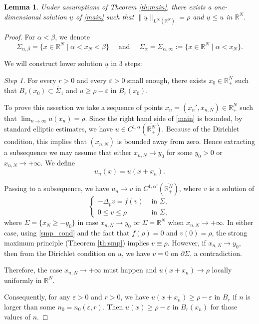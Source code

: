 \documentclass[reqno]{amsart}
\theoremstyle{plain}
\newtheorem{lemma}[theorem]{Lemma}
\theoremstyle{definition}
\theoremstyle{remark}
\begin{document}
	\begin{lemma}\label{lem:lower}
		Under assumptions of Theorem \ref{th:main}, there exists a one-dimensional solution $\underline u$ of \eqref{main} such that $\|\underline u\|_{L^\infty(\mathbb{R}^N)}=\rho$ and $\underline u \le u$ in $\mathbb{R}^N$.
	\end{lemma}
	\begin{proof}
		For $\alpha<\beta$, we denote
		\[
		\Sigma_{\alpha,\beta} = \{x\in\mathbb{R}^N \mid \alpha < x_N < \beta\} \quad\text{ and }\quad \Sigma_\alpha = \Sigma_{\alpha,\infty} := \{x\in\mathbb{R}^N \mid \alpha < x_N \}.
		\]
		
		We will construct lower solution $\underline u$ in 3 steps:
		
		\textit{Step 1.} For every $r > 0$ and every $\varepsilon > 0$ small enough, there exists $x_0 \in \mathbb{R}^N_+$
		such that $B_r(x_0) \subset \overline\Sigma_1$ and $u \ge \rho - \varepsilon$ in $B_r(x_0)$.
		
		To prove this assertion we take a sequence of points $x_n=(x_n', x_{n,N}) \in \mathbb{R}^N_+$ such that $\lim_{n\to\infty} u(x_n) = \rho$. Since the right hand side of \eqref{main} is bounded, by standard elliptic estimates, we have $u\in C^{1,\alpha}(\overline{\mathbb{R}^N_+})$. Because of the Dirichlet condition, this implies that $(x_{n,N})$ is bounded away from zero. Hence extracting a subsequence we may assume that either $x_{n,N}\to y_0$ for some $y_0>0$ or $x_{n,N}\to+\infty$. We define
		\[
		u_n(x) = u(x+x_n).
		\]
		
		Passing to a subsequence, we have $u_n\to v$ in $C^{1,\alpha'}(\overline{\mathbb{R}^N_+})$, where $v$ is a solution of
		\[
		\begin{cases}
			-\Delta_p v = f(v) & \text{ in } \Sigma,\\
			0 \le v \le \rho & \text{ in } \Sigma,
		\end{cases}
		\]
		where $\Sigma=\{x_N \ge -y_0\}$ in case $x_{n,N}\to y_0$ or $\Sigma=\mathbb{R}^N$ when $x_{n,N}\to+\infty$. In either case, using \eqref{smp_cond} and the fact that $f (\rho) = 0$ and $v(0)=\rho$, the strong maximum principle (Theorem \ref{th:smp}) implies $v\equiv\rho$. However, if $x_{n,N}\to y_0$, then from the Dirichlet condition on $u$, we have $v=0$ on $\partial \Sigma$, a contradiction.
		
		Therefore, the case $x_{n,N}\to+\infty$ must happen and $u(x+x_n) \to \rho$ locally uniformly in $\mathbb{R}^N$.
		
		Consequently, for any $\varepsilon > 0$ and $r > 0$, we have $u(x + x_n) \ge \rho - \varepsilon$ in $B_r$ if $n$ is larger than some $n_0 = n_0(\varepsilon, r)$. Then $u(x) \ge \rho - \varepsilon$ in $B_r(x_n)$ for those values of $n$.
		

\end{proof}
\end{document}
